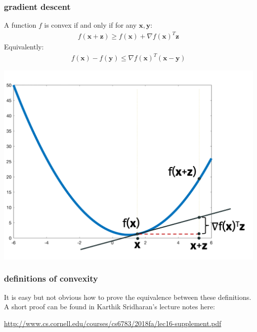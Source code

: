 \documentclass[compress]{beamer}
\newcommand{\bv}[1]{\mathbf{#1}}
\begin{document}
\begin{frame}[t]
	\frametitle{gradient descent}
	\small
		\begin{definition}[Convex]
		A function $f$ is convex if and only if for any $\bv{x}, \bv{y}$:
		\begin{align*}
			f(\bv{x} + \bv{z}) \geq f(\bv{x}) + \nabla f(\bv{x})^T\bv{z}
		\end{align*}
	\vspace{-1em}
	Equivalently:
	\vspace{-.5em}
		\begin{align*}
			f(\bv{x}) - f(\bv{y}) \leq \nabla f(\bv{x})^T (\bv{x} - \bv{y})
		\end{align*}
	\vspace{-1em}
	\end{definition}

	\includegraphics[width=.5\textwidth]{convex2.png}

\end{frame}

\begin{frame}
	\frametitle{definitions of convexity}
	It is easy but not obvious how to prove the equivalence between these definitions. A short proof can be found in Karthik Sridharan's lecture notes here:
	\begin{center}
		\color{blue}
		\href{http://www.cs.cornell.edu/courses/cs6783/2018fa/lec16-supplement.pdf}{http://www.cs.cornell.edu/courses/cs6783/2018fa/lec16-supplement.pdf}
	\end{center}
	
\end{frame}
\end{document}
